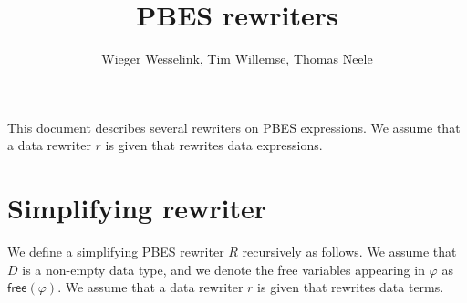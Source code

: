 \documentclass{article}
\begin{document}
\title{PBES rewriters}
\author{Wieger Wesselink, Tim Willemse, Thomas Neele}
\maketitle

This document describes several rewriters on PBES expressions. We assume that a data
rewriter $r$ is given that rewrites data expressions.

\section{Simplifying rewriter}

We define a simplifying PBES rewriter $R$ recursively as follows. We assume
that $D$ is a non-empty data type, and we denote the free variables
appearing in $\varphi $ as $\mathsf{free}(\varphi )$. We assume that a data
rewriter $r$ is given that rewrites data terms.%
\end{document}
